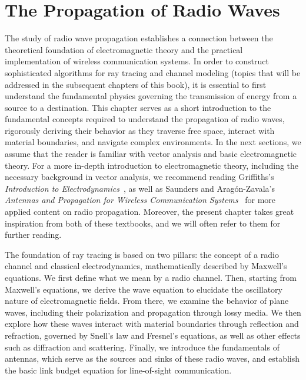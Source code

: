 \chapter{The Propagation of Radio Waves}

The study of radio wave propagation establishes a connection between the theoretical foundation of electromagnetic theory and the practical implementation of wireless communication systems. In order to construct sophisticated algorithms for ray tracing and channel modeling (topics that will be addressed in the subsequent chapters of this book), it is essential to first understand the fundamental physics governing the transmission of energy from a source to a destination. This chapter serves as a short introduction to the fundamental concepts required to understand the propagation of radio waves, rigorously deriving their behavior as they traverse \gls{free space}, interact with material boundaries, and navigate complex environments. In the next sections, we assume that the reader is familiar with vector analysis and basic electromagnetic theory. For a more in-depth introduction to electromagnetic theory, including the necessary background in vector analysis, we recommend reading Griffiths's \emph{Introduction to Electrodynamics}~, as well as Saunders and Aragón-Zavala's \emph{Antennas and Propagation for Wireless Communication Systems}~ for more applied content on radio propagation. Moreover, the present chapter takes great inspiration from both of these textbooks, and we will often refer to them for further reading.

The foundation of ray tracing is based on two pillars: the concept of a radio channel and classical electrodynamics, mathematically described by Maxwell's equations. We first define what we mean by a radio channel. Then, starting from Maxwell's equations, we derive the wave equation to elucidate the oscillatory nature of electromagnetic fields. From there, we examine the behavior of plane waves, including their polarization and propagation through lossy media. We then explore how these waves interact with material boundaries through reflection and refraction, governed by Snell's law and Fresnel's equations, as well as other effects such as diffraction and scattering. Finally, we introduce the fundamentals of antennas, which serve as the sources and sinks of these radio waves, and establish the basic link budget equation for \gls{line-of-sight} communication.

